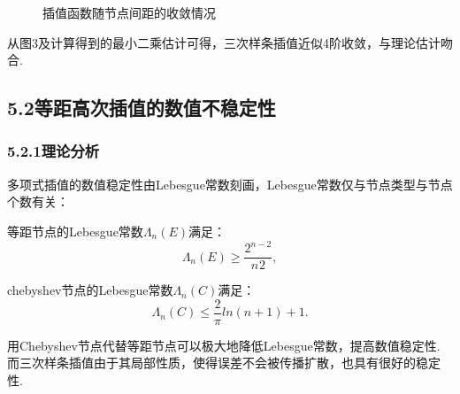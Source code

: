 \documentclass[12pt]{article}
\begin{document}
\begin{figure}[h]
	\label{fig08} 
	\caption{插值函数随节点间距的收敛情况}
\end{figure}

从图3及计算得到的最小二乘估计可得，三次样条插值近似4阶收敛，与理论估计吻合.

\subsection*{{\normalsize 5.2}\quad\normalsize\heiti 等距高次插值的数值不稳定性}  
\subsubsection*{{\small 5.2.1}\quad\small\heiti 理论分析}
\par 多项式插值的数值稳定性由Lebesgue常数刻画，Lebesgue常数仅与节点类型与节点个数有关：
\par 等距节点的Lebesgue常数$\Lambda_{n}(E)$满足：
$$\Lambda_{n}(E)\geq \frac{2^{n-2}}{n^{}2},$$
\par chebyshev节点的Lebesgue常数$\Lambda_{n}(C)$满足：
$$\Lambda_{n}(C) \leq \frac{2}{\pi}ln(n+1)+1.$$
\par 用Chebyshev节点代替等距节点可以极大地降低Lebesgue常数，提高数值稳定性. 而三次样条插值由于其局部性质，使得误差不会被传播扩散，也具有很好的稳定性.
\end{document}
